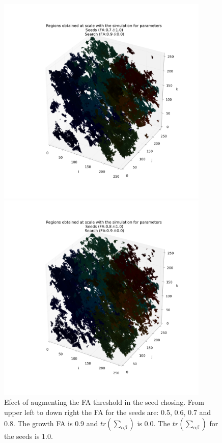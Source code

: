\documentclass[12pt]{article}
\begin{document}
\begin{figure}[ht]
\begin{minipage}{.45\textwidth}
\end{minipage}
\begin{minipage}{.45\textwidth}
  \centering
  \includegraphics[width=0.9\textwidth]{groups/3d/seeds_FA_7/regions_nonoise_seeds_FA_07_Trace_10_search_FA_09_Trace_00_.png}
\end{minipage}
\begin{minipage}{.45\textwidth}
  \centering
  \includegraphics[width=0.9\textwidth]{groups/3d/seeds_FA_8/regions_nonoise_seeds_FA_08_Trace_10_search_FA_09_Trace_00_.png}
\end{minipage}
\caption{Efect of augmenting the FA threshold in the seed chosing. From upper left to down right the FA for the seeds are: 0.5, 0.6, 0.7 and 0.8. The growth FA is 0.9 and $tr \left(\sum_{\alpha\beta}\right)$ is 0.0. The $tr \left(\sum_{\alpha\beta}\right)$ for the seeds is 1.0.} \label{fg:3D_FA_seeds}
\end{figure}
\FloatBarrier
\end{document}
